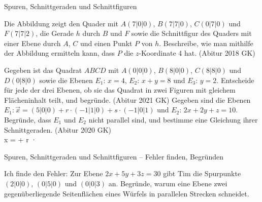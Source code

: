 \begin{aufgabe}{Spuren, Schnittgeraden und Schnittfiguren}
\begin{teile}
\begin{ksys3}[xyz,x1min=0,x1max=8,x2min=0,x2max=8,x3min=0,x3max=8]  \end{ksys3}
\teil Die Abbildung zeigt den Quader mit $A(7|0|0)$, $B(7|7|0)$, $C(0|7|0)$ und $F(7|7|2)$, die Gerade $h$ durch $B$ und $F$ sowie die Schnittfigur des Quaders mit einer Ebene durch $A$, $C$ und einen Punkt $P$ von $h$. Beschreibe, wie man mithilfe der Abbildung ermitteln kann, dass $P$ die $z$-Koordinate 4 hat. \hfill (Abitur 2018 GK)

\begin{ksys3}[xyz,x1min=0,x1max=8,x2min=0,x2max=8,x3min=0,x3max=5]       \end{ksys3}
\teil Gegeben ist das Quadrat $ABCD$ mit $A(0|0|0)$, $B(8|0|0)$, $C(8|8|0)$ und $D(0|8|0)$ sowie die Ebenen $E_1$: $x = 4$, $E_2$: $x + y = 8$ und $E_3$: $y = 2$. Entscheide für jede der drei Ebenen, ob sie das Quadrat in zwei Figuren mit gleichem Flächeninhalt teilt, und begründe. \hfill (Abitur 2021 GK)
\teil Gegeben sind die Ebenen $E_1: \vec{x} = (5|0|0) + r \cdot (-1|1|0) + s \cdot (-1|0|1)$ und $E_2$: $2x + 2y + z = 10$. Begründe, dass $E_1$ und $E_2$ nicht parallel sind, und bestimme eine Gleichung ihrer Schnittgeraden. \hfill (Abitur 2020 GK) \\ x = \leerfeld + r · \leerfeld
\end{teile}
\end{aufgabe}

\begin{aufgabe}{Spuren, Schnittgeraden und Schnittfiguren – Fehler finden, Begründen}
\begin{teile}
\teil Ich finde den Fehler: Zur Ebene $2x + 5y + 3z = 30$ gibt Tim die Spurpunkte $(2|0|0)$, $(0|5|0)$ und $(0|0|3)$ an.
\teil Begründe, warum eine Ebene zwei gegenüberliegende Seitenflächen eines Würfels in parallelen Strecken schneidet.
\end{teile}
\end{aufgabe}
